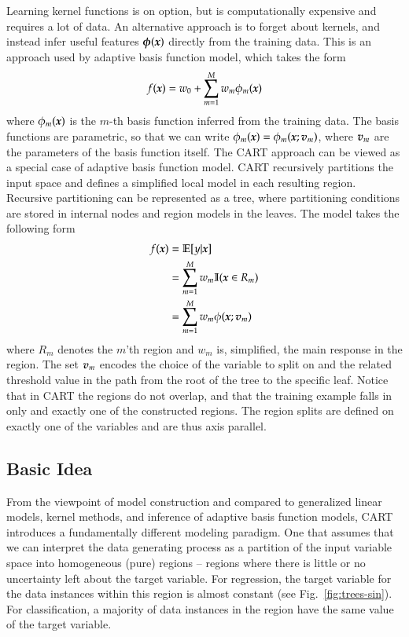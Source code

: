 \begin{refsection}
Learning kernel functions is on option, but is computationally expensive and requires a lot of data. An alternative approach is to forget about kernels, and instead infer useful features $\boldsymbol{\phi}(\boldsymbol{x})$ directly from the training data. This is an approach used by adaptive basis function model, which takes the form
$$ f(\boldsymbol{x})=w_0+\sum_{m=1}^{M} w_m\phi_m(\boldsymbol{x}) $$
where $\phi_m(\boldsymbol{x})$ is the $m$-th basis function inferred from the training data. The basis functions are parametric, so that we can write $\phi_m(\boldsymbol{x})=\phi_m(\boldsymbol{x};\boldsymbol{v}_m)$, where $\boldsymbol{v}_m$ are the parameters of the basis function itself. The CART approach can be viewed as a special case of adaptive basis function model. CART recursively partitions the input space and defines a simplified local model in each resulting region. Recursive partitioning can be represented as a tree, where partitioning conditions are stored in internal nodes and region models in the leaves. The model takes the following form
\begin{align}
f(\boldsymbol{x}) & = \mathbb{E}[y|\boldsymbol{x}] \\
 & = \sum_{m=1}^M w_m \mathbb{I}(\boldsymbol{x}\in R_m) \\
 & = \sum_{m=1}^M w_m\phi(\boldsymbol{x};\boldsymbol{v}_m)
\end{align}
where $R_m$ denotes the $m$'th region and $w_m$ is, simplified, the main response in the region. The set $\boldsymbol{v}_m$ encodes the choice of the variable to split on and the related threshold value in the path from the root of the tree to the specific leaf. Notice that in CART the regions do not overlap, and that the training example falls in only and exactly one of the constructed regions. The region splits are defined on exactly one of the variables and are thus axis parallel.

\subsection*{Basic Idea}

From the viewpoint of model construction and compared to generalized linear models, kernel methods, and inference of adaptive basis function models, CART introduces a fundamentally different modeling paradigm. One that assumes that we can interpret the data generating process as a partition of the input variable space into homogeneous (pure) regions -- regions where there is little or no uncertainty left about the target variable. For regression, the target variable for the data instances within this region is almost constant (see Fig.~\ref{fig:trees-sin}). For classification, a majority of data instances in the region have the same value of the target variable.


\end{refsection}
